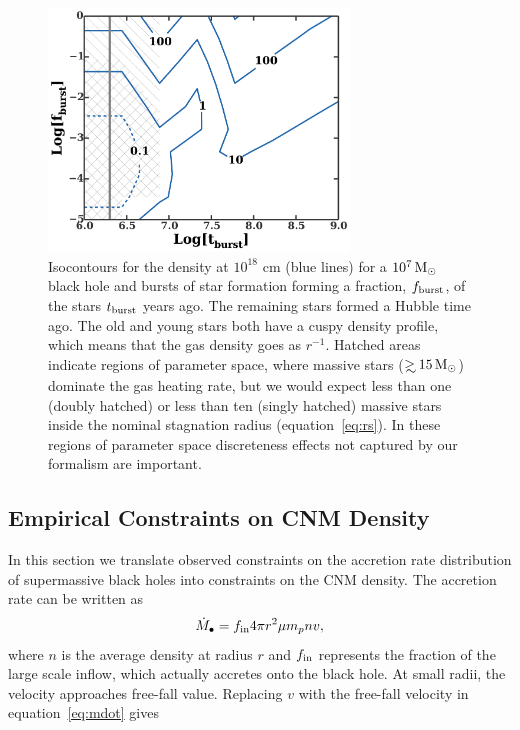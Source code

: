 \documentclass[usenatbib,fleqn]{mnras}
\newcommand\gsim{\mathrel{\rlap{\lower4pt\hbox{\hskip1pt$\sim$}}
    \raise1pt\hbox{$>$}}}
\newcommand{\Msun}{{\rm M_\odot}}
\begin{document}
\begin{figure} 
  \includegraphics[width=8cm]{cnm_plot.pdf}
  \caption{\label{fig:param} Isocontours for the density at $10^{18}$
    cm (blue lines) for a $10^{7} \, \Msun$ black hole and bursts of
    star formation forming a fraction, $f_{\rm burst}$, of the stars
    $t_{\rm burst}$ years ago. The remaining stars formed a Hubble
    time ago. The old and young stars both have a cuspy density
    profile, which means that the gas density goes as $r^{-1}$.
    Hatched areas indicate regions of parameter space, where massive
    stars ($\gsim 15 \, \Msun$) dominate the gas heating rate, but we
    would expect less than one (doubly hatched) or less than ten
    (singly hatched) massive stars inside the nominal stagnation
    radius (equation~\ref{eq:rs}). In these regions of parameter space
    discreteness effects not captured by our formalism are important.}
\end{figure}



\subsection{Empirical Constraints on CNM Density}
\label{sec:empirical}

In this section we translate observed constraints on the accretion
rate distribution of supermassive black holes into constraints on the CNM
density.  The accretion rate can be written as
\begin{equation}
\dot{M}_{\bullet} = f_{\rm in} 4 \pi r^2 \mu m_p n v,
\label{eq:mdot}
\end{equation}
where $n$ is the average density at radius $r$ and $f_{\rm in}$
represents the fraction of the large scale inflow, which actually
accretes onto the black hole. At small radii, the velocity approaches
free-fall value. Replacing $v$ with the free-fall velocity in
equation~\eqref{eq:mdot} gives
\end{document}

